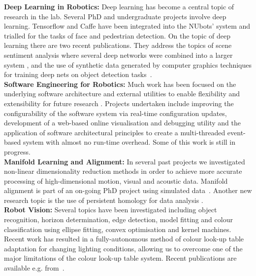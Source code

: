 \documentclass{llncs}
\begin{document}
\noindent\textbf{Deep Learning in Robotics:} 
Deep learning has become a central topic of research in the lab. Several PhD and undergraduate projects involve deep learning. Tensorflow and Caffe have been integrated into the NUbots' system and trialled for the tasks of face and pedestrian detection. On the topic of deep learning there are two recent publications. They address the topics of scene sentiment analysis where several deep networks were combined into a larger system \cite{AbbasChalup2017}, and the use of synthetic data generated by computer graphics techniques for training deep nets on object detection tasks~\cite{JabbarEtAl2017}.\\

\noindent\textbf{Software Engineering for Robotics:} Much work has been focused on the underlying software architecture and external utilities to enable flexibility and extensibility for future research \cite{Kulk2011c,HoulistonEtAl2016}. Projects undertaken include improving the configurability of the software system via real-time configuration updates, development of a web-based online visualisation and debugging utility \cite{AnnableEtAl2014} and the application of software architectural principles to create a multi-threaded event-based system with almost no run-time overhead. Some of this work is still in progress.\\ %

\noindent\textbf{Manifold Learning and Alignment:} In several past projects we investigated non-linear dimensionality reduction
methods in order to achieve more accurate processing of high-dimensional motion, visual and acoustic data. %
Manifold alignment is part of an on-going PhD project using simulated data~\cite{AzizEtAl2015}. Another new research topic is the use of persistent homology for data analysis \cite{PaulChalup2017}.\\

\noindent\textbf{Robot Vision:}  Several topics have been investigated including object recognition, horizon determination, edge detection, model fitting and colour classification using ellipse fitting, convex optimisation and kernel machines. Recent work has resulted in a fully-autonomous method of colour look-up table adaptation for changing lighting conditions, allowing us to overcome one of the major limitations of the colour look-up table system. Recent publications are available e.g. %
from~\cite{HoulistonEtAl2015,MetcalfeEtAl2016}.\\
\end{document}
